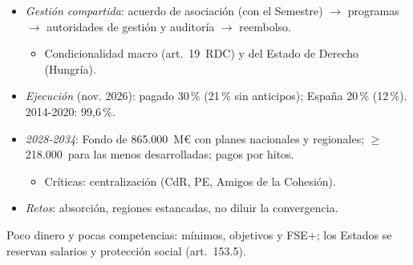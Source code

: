 \documentclass{article}
\begin{document}
\begin{columnas}
\begin{itemize}
\item \emph{Gestión compartida}: acuerdo de asociación (con el Semestre) $\to$ programas $\to$ autoridades de gestión y auditoría $\to$ reembolso.
  \begin{itemize}
  \item Condicionalidad macro (art.~19~RDC) y del Estado de Derecho (Hungría).
  \end{itemize}
\item \emph{Ejecución} (nov. 2026): pagado 30\,\% (21\,\% sin anticipos); España 20\,\% (12\,\%). 2014-2020: 99,6\,\%.
\item \emph{2028-2034}: Fondo de 865.000~M€ con planes nacionales y regionales; $\geq$218.000~para las menos desarrolladas; pagos por hitos.
  \begin{itemize}
  \item Críticas: centralización (CdR, PE, Amigos de la Cohesión).
  \end{itemize}
\item \emph{Retos}: absorción, regiones estancadas, no diluir la convergencia.
\end{itemize}

\begin{ideaclave}
Poco dinero y pocas competencias: mínimos, objetivos y FSE+; los Estados se reservan salarios y protección social (art.~153.5).
\end{ideaclave}


\end{columnas}
\end{document}
